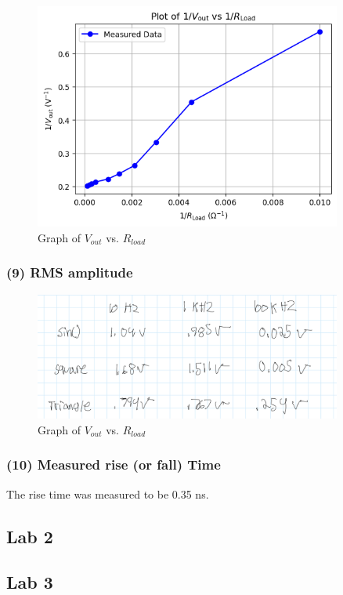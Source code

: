 \documentclass{article}
\begin{document}
    \begin{figure}[H]
        \centering
        \includegraphics[width=0.9\textwidth]{img/Lab1_8a.png}  
        \caption{Graph of $V_{out}$ vs. $R_{load}$}
        \label{fig:Derived Voltage Formula Graphs}
    \end{figure}

    \subsubsection{(9) RMS amplitude }
    \begin{figure}[H]
        \centering
        \includegraphics[width=0.9\textwidth]{img/Lab1_9.png}  
        \caption{Graph of $V_{out}$ vs. $R_{load}$}
        \label{fig:RMS amplitude}
    \end{figure}

    \subsubsection{(10) Measured rise (or fall) Time }
    The rise time was measured to be 0.35 ns.

\begin{center}
    \section*{Lab 2}
\end{center}


\begin{center}
    \section*{Lab 3}
    \end{center}
\end{document}
